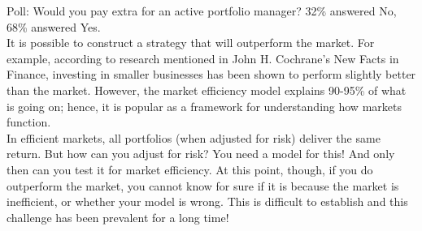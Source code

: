 \begin{commentbox}{Poll: Would you pay extra for an active portfolio manager?}
32\% answered No, 68\% answered Yes.\\

It is possible to construct a strategy that will outperform the market. For example, according to research mentioned in John H. Cochrane's New Facts in Finance, investing in smaller businesses has been shown to perform slightly better than the market. However, the market efficiency model explains 90-95\% of what is going on; hence, it is popular as a framework for understanding how markets function.\\

In efficient markets, all portfolios (when adjusted for risk) deliver the same return. But how can you adjust for risk? You need a model for this! And only then can you test it for market efficiency. At this point, though, if you do outperform the market, you cannot know for sure if it is because the market is inefficient, or whether your model is wrong. This is difficult to establish and this challenge has been prevalent for a long time!
\end{commentbox}